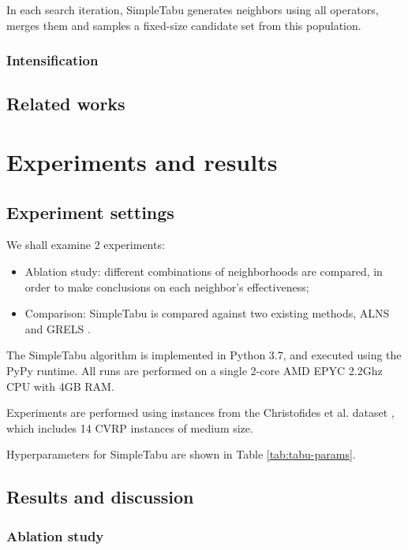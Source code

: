 \documentclass[12pt]{report}
\begin{document}
In each search iteration, SimpleTabu generates neighbors using all operators, merges them and samples a fixed-size candidate set from this population.

\subsection{Intensification}

\section{Related works}

\chapter{Experiments and results}
\section{Experiment settings}
We shall examine 2 experiments:
\begin{itemize}
	\item Ablation study: different combinations of neighborhoods are compared, in order to make conclusions on each neighbor's effectiveness;
	\item Comparison: SimpleTabu is compared against two existing methods, ALNS \cite{pisinger2007general} and GRELS \cite{prins2009grasp}.
\end{itemize}

The SimpleTabu algorithm is implemented in Python 3.7, and executed using the PyPy \cite{rigo2006pypy} runtime. All runs are performed on a single 2-core AMD EPYC 2.2Ghz CPU with 4GB RAM.

Experiments are performed using instances from the Christofides et al. dataset \cite{christofides1976vehicle}, which includes 14 CVRP instances of medium size.

Hyperparameters for SimpleTabu are shown in Table \ref{tab:tabu-params}.



\section{Results and discussion}
\subsection{Ablation study}
\end{document}
